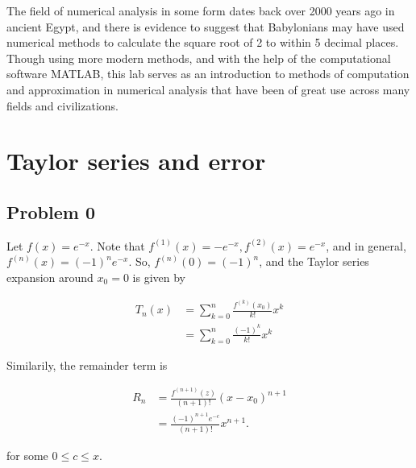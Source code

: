 \documentclass[letter,11pt]{article}
\begin{document}
The field of numerical analysis in some form dates back over 2000 years ago in ancient Egypt, and there is evidence to suggest that Babylonians may have used numerical methods to calculate the square root of 2 to within 5 decimal places.
Though using more modern methods, and with the help of the computational software MATLAB, this lab serves as an introduction to methods of computation and approximation in numerical analysis that have been of great use across many fields and civilizations.

\section{Taylor series and error}

\setcounter{subsection}{-1}
\subsection{Problem 0}
Let $f(x) = e^{-x}$. Note that $f^{(1)}(x) = -e^{-x}, f^{(2)}(x) = e^{-x}$, and in general, $f^{(n)}(x) = (-1)^ne^{-x}$. So, $f^{(n)}(0) = (-1)^n$, and the Taylor series expansion around $x_0 = 0$ is given by

\begin{align*}
T_n(x) &= \sum_{k = 0}^n \frac{f^{(k)}(x_0)}{k!} x^k \\
&= \sum_{k = 0}^n \frac{(-1)^k}{k!}x^k
\end{align*}

Similarily, the remainder term is

\begin{align*}
R_n &= \frac{f^{(n + 1)}(z)}{(n + 1)!}(x - x_0)^{n + 1} \\
&= \frac{(-1)^{n + 1} e^{-c}}{(n + 1)!}x^{n + 1}.
\end{align*}

for some $0 \leq c \leq x$.
\end{document}
